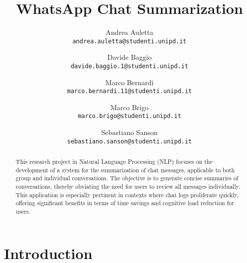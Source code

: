 \documentclass[10pt,twocolumn,letterpaper]{article}
\begin{document}
\title{WhatsApp Chat Summarization}

\author{Andrea Auletta\\
{\tt\small andrea.auletta@studenti.unipd.it}
\and
Davide Baggio\\
{\tt\small davide.baggio.1@studenti.unipd.it}
\and
Marco Bernardi\\
{\tt\small marco.bernardi.11@studenti.unipd.it}
\and
Marco Brigo\\
{\tt\small marco.brigo@studenti.unipd.it}
\and
Sebastiano Sanson\\
{\tt\small sebastiano.sanson@studenti.unipd.it}
}

\maketitle

\begin{abstract}This research project in Natural Language Processing (NLP) 
   focuses on the development of a system for the summarization 
   of chat messages, applicable to both group and individual conversations. The objective is to generate concise summaries of conversations, 
   thereby obviating the need for users to review all messages individually. 
   This application is especially pertinent in contexts where chat logs proliferate quickly, 
   offering significant benefits in terms of time savings and cognitive load reduction for users.
\end{abstract}

\section{Introduction}
\end{document}
